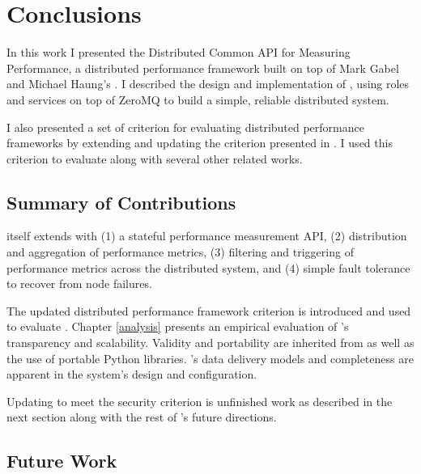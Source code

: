 \chapter{Conclusions}
\label{conclusions}

In this work I presented the Distributed Common API for Measuring Performance, a distributed performance framework built
on top of Mark Gabel and Michael Haung's \camp \cite{gabel2007}. I described the design and implementation of \dcampns,
using roles and services on top of ZeroMQ to build a simple, reliable distributed system.

I also presented a set of criterion for evaluating distributed performance frameworks by extending and updating the
criterion presented in \cite{zanikolas2005}. I used this criterion to evaluate \dcamp along with several other related
works.

\section{Summary of Contributions}

\dcamp itself extends \camp with (1) a stateful performance measurement API, (2) distribution and aggregation of
performance metrics, (3) filtering and triggering of performance metrics across the distributed system, and (4) simple
fault tolerance to recover from node failures.

The updated distributed performance framework criterion is introduced and used to evaluate \dcampns. Chapter
\ref{analysis} presents an empirical evaluation of \dcampns's transparency and scalability. Validity and portability are
inherited from \camp as well as the use of portable Python libraries. \dcampns's data delivery models and completeness
are apparent in the system's design and configuration.

Updating \dcamp to meet the security criterion is unfinished work as described in the next section along with the rest
of \dcampns's future directions.

\section{Future Work}
\label{future_work}

